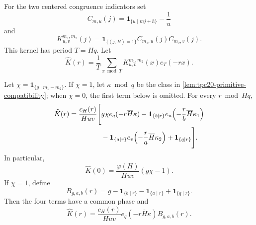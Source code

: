 For the two centered congruence indicators set
\begin{equation}
 C_{m,u}(j)=\mathbf 1_{\{u\mid mj+h\}}-\frac1u
 \label{eq:tpc20-centered-indicator}
\end{equation}
and
\begin{equation}
 K_{u,v}^{m_1,m_2}(j)
 =\mathbf 1_{\{(j,H)=1\}}C_{m_1,u}(j)C_{m_2,v}(j).
 \label{eq:tpc20-periodic-kernel}
\end{equation}
This kernel has period \(T=Hq\).  Let
\begin{equation}
 \widehat K(r)=\frac1T\sum_{x\bmod T}K_{u,v}^{m_1,m_2}(x)e_T(-rx).
 \label{eq:tpc20-Khat}
\end{equation}

\begin{theorem}
\label{thm:tpc20-four-channel-coefficients}
Let
\(\chi=\mathbf 1_{\{g\mid m_1-m_2\}}\).  If \(\chi=1\), let
\(\kappa\bmod q\) be the class in
\cref{lem:tpc20-primitive-compatibility}; when \(\chi=0\), the first term
below is omitted.  For every \(r\bmod Hq\),
\begin{align}
 \widehat K(r)
 =\frac{c_H(r)}{Huv}\Bigg[{}
 &g\chi e_q(-r\overline H\kappa)
 -\mathbf 1_{\{b\mid r\}}
   e_u\!\left(-\frac rb\overline H\kappa_1\right)
 \notag\\
 &-\mathbf 1_{\{a\mid r\}}
   e_v\!\left(-\frac ra\overline H\kappa_2\right)
 +\mathbf 1_{\{q\mid r\}}\Bigg].
 \label{eq:tpc20-four-channel-Khat}
\end{align}
In particular,
\begin{equation}
 \widehat K(0)
 =\frac{\varphi(H)}{Huv}(g\chi-1).
 \label{eq:tpc20-zero-mode}
\end{equation}
If \(\chi=1\), define
\begin{equation}
 B_{g,a,b}(r)
 =g-\mathbf 1_{\{b\mid r\}}-\mathbf 1_{\{a\mid r\}}
   +\mathbf 1_{\{q\mid r\}}.
 \label{eq:tpc20-common-multiplier}
\end{equation}
Then the four terms have a common phase and
\begin{equation}
 \boxed{
 \widehat K(r)
 =\frac{c_H(r)}{Huv}e_q(-r\overline H\kappa)
 B_{g,a,b}(r).}
 \label{eq:tpc20-compatible-Khat}
\end{equation}
\end{theorem}

